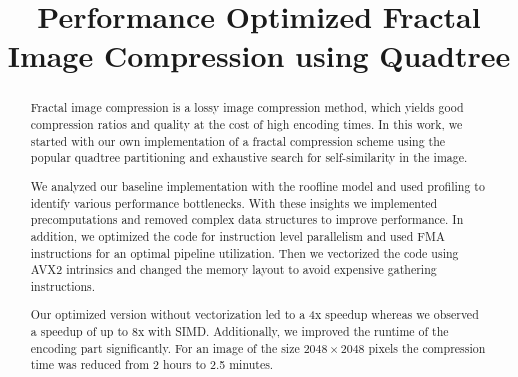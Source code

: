 \documentclass[letterpaper]{article}
\title{Performance Optimized Fractal Image Compression using Quadtree}
\begin{document}
%
\maketitle
%
%

\setlength{\abovedisplayskip}{1ex}
\setlength{\belowdisplayskip}{1ex}

\begin{abstract}
  Fractal image compression is a lossy image compression method, which yields
  good compression ratios and quality at the cost of high encoding times. In
  this work, we started with our own implementation of a fractal compression
  scheme using the popular quadtree partitioning and exhaustive search for
  self-similarity in the image.

  We analyzed our baseline implementation with the roofline model and used
  profiling to identify various performance bottlenecks. With these insights we
  implemented precomputations and removed complex data structures to improve
  performance. In addition, we optimized the code for instruction level
  parallelism and used FMA instructions for an optimal pipeline utilization.
  Then we vectorized the code using AVX2 intrinsics and changed the memory
  layout to avoid expensive gathering instructions.

  Our optimized version without vectorization led to a 4x speedup whereas we
  observed a speedup of up to 8x with SIMD. Additionally, we improved the
  runtime of the encoding part significantly. For an image of the size
  $2048 \times 2048$ pixels the compression time was reduced from 2 hours to 2.5
  minutes.

\end{abstract}










\end{document}
